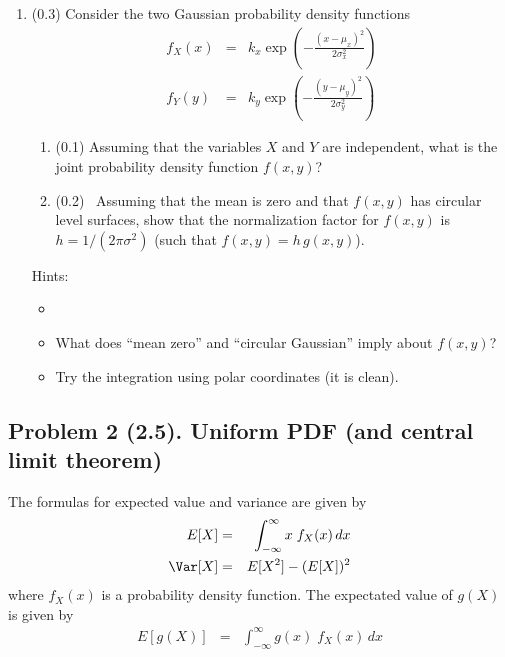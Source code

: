 \documentclass[11pt,titlepage,fleqn]{article}
\begin{document}
\begin{enumerate}
\item (0.3) Consider the two Gaussian probability density functions
%
\begin{eqnarray}
f_X(x) &=& k_x \exp\left(-\frac{(x-\mu_x)^2}{2\sigma_x^2} \right)
\\
f_Y(y) &=& k_y \exp\left(-\frac{(y-\mu_y)^2}{2\sigma_y^2} \right)
\end{eqnarray}
%
\begin{enumerate}
\item (0.1) Assuming that the variables $X$ and $Y$ are independent, what is the joint probability density function $f(x,y)$?
\item (0.2) \ptag\ Assuming that the mean is zero and that $f(x,y)$ has circular level surfaces, show that the normalization factor for $f(x,y)$ is $h = 1/(2\pi\sigma^2)$ (such that $f(x,y) = h\,g(x,y)$).
\end{enumerate}

Hints:
\begin{itemize}
\item \citet[][eq. B.28]{Aster}
\item What does ``mean zero'' and ``circular Gaussian'' imply about $f(x,y)$?
\item Try the integration using polar coordinates (it is clean).
\end{itemize}


\end{enumerate}


\subsection*{Problem 2 (2.5). Uniform PDF (and central limit theorem)}

The formulas for expected value and variance are given by
%
\begin{eqnarray}
E[X] &=& \int_{-\infty}^{\infty} x\;f_X(x) \,dx
\label{EX}
\\
\Var[X] &=& E[X^2] - (E[X])^2
\label{var}
\end{eqnarray}
%
where $f_X(x)$ is a probability density function. The expectated value of $g(X)$ is given by
%
\begin{eqnarray}
E[g(X)] &=& \int_{-\infty}^{\infty} g(x)\;f_X(x) \,dx
\label{Egx}
\end{eqnarray}

\end{document}
